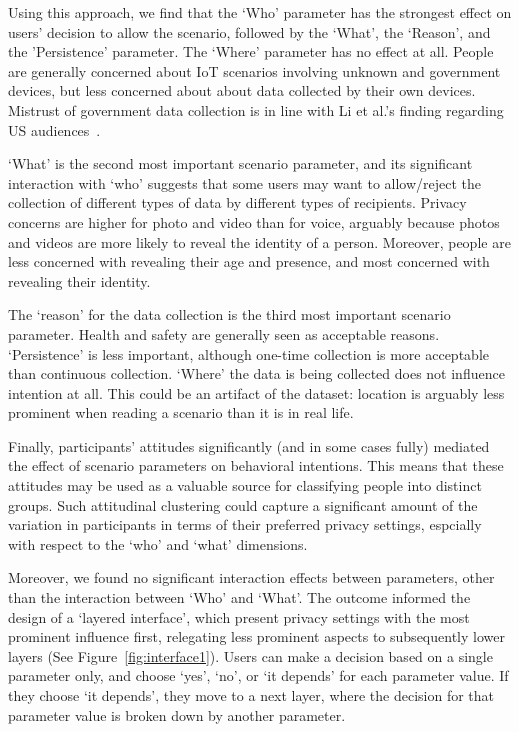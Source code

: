 Using this approach, we find that the `Who' parameter has the strongest effect on users' decision to allow the scenario, followed by the `What', the `Reason', and the 'Persistence' parameter. The `Where' parameter has no effect at all. People are generally concerned about IoT scenarios involving unknown and government devices, but less concerned about about data collected by their own devices. Mistrust of government data collection is in line with Li et al.'s finding regarding US audiences~\cite{li2017cross}.

`What' is the second most important scenario parameter, and its significant interaction with `who' suggests that some users may want to allow/reject the collection of different types of data by different types of recipients. Privacy concerns are higher for photo and video than for voice, arguably because photos and videos are more likely to reveal the identity of a person. Moreover, people are less concerned with revealing their age and presence, and most concerned with revealing their identity.

The `reason' for the data collection is the third most important scenario parameter. Health and safety are generally seen as acceptable reasons. `Persistence' is less important, although one-time collection is more acceptable than continuous collection. `Where' the data is being collected does not influence intention at all. This could be an artifact of the dataset: location is arguably less prominent when reading a scenario than it is in real life.

Finally, participants' attitudes significantly (and in some cases fully) mediated the effect of scenario parameters on behavioral intentions. This means that these attitudes may be used as a valuable source for classifying people into distinct groups. Such attitudinal clustering could capture a significant amount of the variation in participants in terms of their preferred privacy settings, espcially with respect to the `who' and `what' dimensions.

Moreover, we found no significant interaction effects between parameters, other than the interaction between `Who' and `What'. The outcome informed the design of a `layered interface', which present privacy settings with the most prominent influence first, relegating less prominent aspects to subsequently lower layers (See Figure~\ref{fig:interface1}). Users can make a decision based on a single parameter only, and choose `yes', `no', or `it depends' for each parameter value. If they choose `it depends', they move to a next layer, where the decision for that parameter value is broken down by another parameter.

